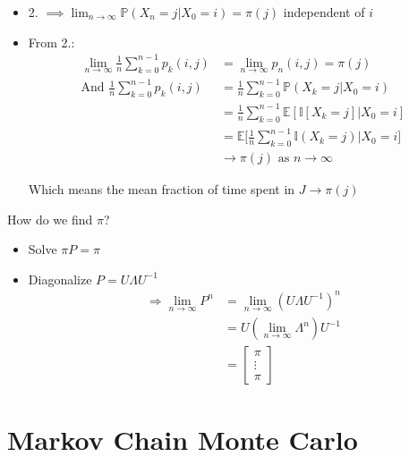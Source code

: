 \documentclass[12pt, letterpaper]{article}
\begin{document}
\begin{itemize}
    \item 2. $\implies \displaystyle\lim_{n\rightarrow\infty} \mathbb{P}(X_n = j | X_0 = i)=\pi(j)$ independent of $i$
    \item From 2.:
    \begin{align*}
        \lim_{n\rightarrow\infty} \frac 1n \sum_{k=0}^{n-1}p_k(i,j) &= \lim_{n\rightarrow\infty} p_n(i,j) = \pi(j)\\
        \text{And } \frac 1n \sum_{k=0}^{n-1} p_k(i,j) &= \frac 1n \sum_{k=0}^{n-1}\mathbb{P}(X_k = j | X_0 = i) \\
        &= \frac 1n \sum_{k=0}^{n-1}\mathbb{E}[\mathbb{I}[X_k=j]|X_0 =i] \\
        &= \mathbb{E} \Big[\frac 1n \sum_{k=0}^{n-1} \mathbb{I}(X_k = j) | X_0 = i\Big] \\
        &\rightarrow \pi(j) \text{ as } n \rightarrow \infty 
    \end{align*}
    \begin{center}
        Which means the mean fraction of time spent in $J \rightarrow \pi (j)$
    \end{center}
\end{itemize}  
How do we find $\pi$?
\begin{itemize}
    \item Solve $\pi P = \pi$
    \item Diagonalize $P = U\Lambda U^{-1}$
    \begin{align*}
        \Rightarrow \lim_{n\rightarrow\infty} P^n &= \lim_{n\rightarrow\infty}(U\Lambda U^{-1})^n \\
        &= U(\lim_{n\rightarrow\infty}\Lambda ^n)U^{-1} \\
        &= \begin{bmatrix}
            \pi \\ \vdots \\ \pi
        \end{bmatrix}
    \end{align*}
\end{itemize}

\section{Markov Chain Monte Carlo}
\end{document}
